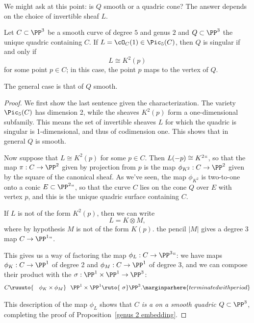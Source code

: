 We might ask at this point: is $Q$ smooth or a quadric cone? The answer
depends on the choice of invertible sheaf $L$.

\begin{proposition}
\label{genus 2 embedding}
Let $C \subset \PP^3$ be a smooth curve of degree $5$ and genus $2$ and
$Q \subset \PP^3$ the unique quadric containing $C$. If $L = \cO_C(1)
\in \Pic_5(C)$, then $Q$ is singular if and only if
$$
L \cong K^2(p)
$$
for some point $p \in C$; in this case, the point $p$ maps to the vertex
of $Q$.

The general case is that of $Q$ smooth.
\end{proposition}

\begin{proof}
We first show the last sentence given the characterization.
The variety $\Pic_5(C)$ has dimension 2, while the sheaves
$K^2(p)$ form a one-dimensional subfamily.
This means the set of invertible sheaves $L$
for which the quadric is singular is 1-dimensional, and thus of
codimension one. This shows that in general $Q$ is smooth.

Now suppose that
$L \cong K^2(p)$ for some $p \in
C$. Then $L(-p) \cong K^2` `$, so that the map $\pi : C \to \PP^2$ given
by projection from $p$ is the map $\phi_{K^2} : C \to \PP^2$ given by
the square of the canonical sheaf. As we've seen, the map $\phi_{K^2}$
is two-to-one onto a conic $E \subset \PP^2` `$, so that the curve $C$
lies on the cone $Q$ over $E$ with vertex $p$, and this is the unique
quadric surface containing $C$.

If $L$ is not of the form $K^2(p)$, then we can write
$$
L = K \otimes M,
$$
where by hypothesis $M$ is not of the form $K(p)$.
the pencil $|M|$ gives a
degree 3 map $C \to \PP^1` `$.

This gives us a way of factoring the map $\phi_L : C \to \PP^3` `$: we
have maps $\phi_K : C \to \PP^1$ of degree 2 and $\phi_M : C \to \PP^1$
of degree 3, and we can compose their product with the
%
$\sigma : \PP^1 \times \PP^1 \to \PP^3$:
$$
C\ruuuto {\hskip0.9em\phi_K \times \phi_M}\hskip0.7em
\PP^1 \times \PP^1  \ruto {\ \sigma}  \PP^3.
\marginparhere{terminated with period}
$$

This description of the map $\phi_L$  shows  that \emph{$C$ is a
%
on a smooth quadric $Q \subset \PP^3$}, completing the
proof of Proposition~\ref{genus 2 embedding}.
\end{proof}

